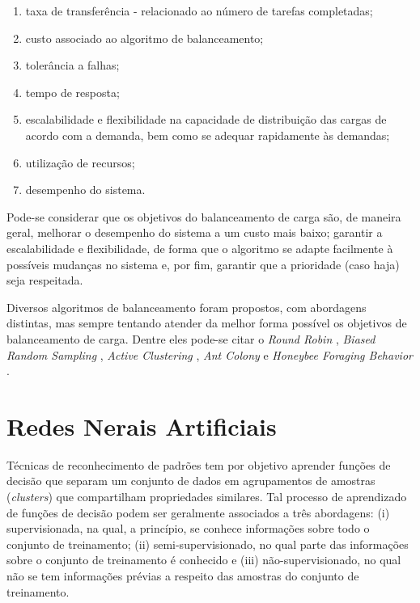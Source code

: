 \begin{enumerate}
	\item taxa de transferência - relacionado ao número de tarefas completadas; 
	\item custo associado ao algoritmo de balanceamento; 
	\item tolerância a falhas;
	\item tempo de resposta; 
	\item escalabilidade e flexibilidade na capacidade de distribuição das cargas de acordo com a demanda, bem como se adequar rapidamente às demandas; 
	\item utilização de recursos;
	\item desempenho do sistema. 	
\end{enumerate}


Pode-se considerar que os objetivos do balanceamento de carga são, de maneira geral, melhorar o desempenho do sistema a um custo mais baixo; garantir a escalabilidade e flexibilidade, de forma que o algoritmo se adapte facilmente à possíveis mudanças no sistema e, por fim, garantir que a prioridade (caso haja) seja respeitada\cite{kaur2012load}. 

Diversos algoritmos de balanceamento foram propostos, com abordagens distintas, mas sempre tentando atender da melhor forma possível os objetivos de balanceamento de carga. Dentre eles pode-se citar o \textit{Round Robin} \cite{soni2014novel}, \textit{Biased Random Sampling} \cite{randles2010comparative1}, \textit{Active Clustering} \cite{randles2010comparative1}, \textit{Ant Colony}\cite{nishant2012load} e \textit{Honeybee Foraging Behavior} \cite{randles2010comparative1}.  

\newpage
\section{Redes Nerais Artificiais}\label{sec:rna}

Técnicas de reconhecimento de padrões tem por objetivo aprender funções de decisão que separam um conjunto de dados em agrupamentos de amostras (\textit{clusters}) que compartilham propriedades similares\cite{Duda:00}. Tal processo de aprendizado de funções de decisão podem ser geralmente associados a três abordagens: (i) supervisionada, na qual, a princípio, se conhece informações sobre todo o conjunto de treinamento; (ii) semi-supervisionado, no qual parte das informações sobre o conjunto de treinamento é conhecido e (iii) não-supervisionado, no qual não se tem informações prévias a respeito das amostras do conjunto de treinamento. 

